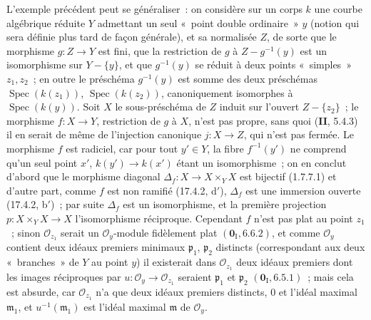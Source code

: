 \begin{env}[11.7.3]
\label{IV.11.7.3-fr}
L'exemple précédent peut se généraliser~: on considère sur un corps $k$ une
courbe algébrique réduite $Y$ admettant un seul «~point double ordinaire~» $y$
(notion qui sera définie plus tard de façon générale), et sa normalisée $Z$, de
sorte que le morphisme $g:Z\to Y$ est fini, que la restriction de $g$ à
$Z-g^{-1}(y)$ est un isomorphisme sur $Y-\{y\}$, et que $g^{-1}(y)$ se réduit à
deux points «~simples~» $z_1,z_2$~; en outre le préschéma $g^{-1}(y)$ est somme
des deux préschémas $\operatorname{Spec}(k(z_1))$,
$\operatorname{Spec}(k(z_2))$, canoniquement isomorphes à
$\operatorname{Spec}(k(y))$. Soit $X$ le sous-préschéma de $Z$ induit sur
l'ouvert $Z-\{z_2\}$~; le morphisme $f:X\to Y$, restriction de $g$ à $X$, n'est
pas propre, sans quoi (\textbf{II}, 5.4.3) il en serait de même de l'injection
canonique $j:X\to Z$, qui n'est pas fermée. Le morphisme $f$ est radiciel, car
pour tout $y'\in Y$, la fibre $f^{-1}(y')$ ne comprend qu'un seul point $x'$,
$k(y')\to k(x')$ étant un isomorphisme~; on en conclut d'abord que le morphisme
diagonal $\Delta_f:X\to X\times_Y X$ est bijectif (1.7.7.1) et d'autre part,
comme $f$ est non ramifié (17.4.2, d$'$), $\Delta_f$ est une immersion ouverte
(17.4.2, b$'$)~; par suite $\Delta_f$ est un isomorphisme, et la première
projection $p:X\times_Y X\to X$ l'isomorphisme réciproque. Cependant $f$ n'est
pas plat au point $z_1$~; sinon $\mathcal O_{z_1}$ serait un
$\mathcal O_y$-module fidèlement plat $(\mathbf 0_{\mathrm I},6.6.2)$, et comme
$\mathcal O_y$ contient deux idéaux premiers minimaux $\mathfrak p_1$,
$\mathfrak p_2$ distincts (correspondant aux deux «~branches~» de $Y$ au point
$y$) il existerait dans $\mathcal O_{z_1}$ deux idéaux premiers dont les images
réciproques par $u:\mathcal O_y\to\mathcal O_{z_1}$ seraient
$\mathfrak p_1$ et $\mathfrak p_2$ $(\mathbf 0_{\mathrm I},6.5.1)$~; mais cela
est absurde, car $\mathcal O_{z_1}$ n'a que deux idéaux premiers distincts, $0$
et l'idéal maximal $\mathfrak m_1$, et $u^{-1}(\mathfrak m_1)$ est l'idéal
maximal $\mathfrak m$ de $\mathcal O_y$.
\end{env}

